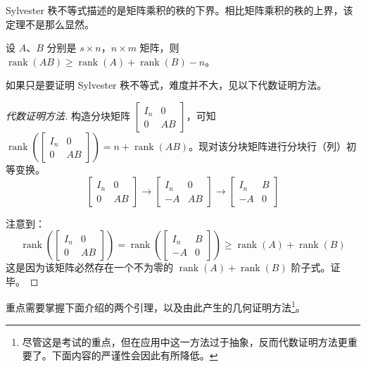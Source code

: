 Sylvester 秩不等式描述的是矩阵乘积的秩的下界。相比矩阵乘积的秩的上界，该定理不是那么显然。

\begin{theorem}
	设 $A$、$B$ 分别是 $s \times n$，$n \times m$ 矩阵，则 $\operatorname{rank}(AB) \ge \operatorname{rank}(A) + \operatorname{rank}(B) - n$。
\end{theorem}

如果只是要证明 Sylvester 秩不等式，难度并不大，见以下代数证明方法。

\begin{proof}[代数证明方法]
	构造分块矩阵 $\begin{bmatrix} I_n & 0 \\ 0 & AB \end{bmatrix}$，可知 $\operatorname{rank}\left(\begin{bmatrix} I_n & 0 \\ 0 & AB \end{bmatrix}\right) = n + \operatorname{rank}(AB)$。现对该分块矩阵进行分块行（列）初等变换。
	$$
	\begin{bmatrix} I_n & 0 \\ 0 & AB \end{bmatrix} \to
	\begin{bmatrix} I_n & 0 \\ -A & AB \end{bmatrix} \to
	\begin{bmatrix} I_n & B \\ -A & 0 \end{bmatrix}
	$$

	注意到：
	$$
	\operatorname{rank}\left(\begin{bmatrix} I_n & 0 \\ 0 & AB \end{bmatrix}\right) = \operatorname{rank}\left(\begin{bmatrix} I_n & B \\ -A & 0 \end{bmatrix}\right) \ge \operatorname{rank}(A) + \operatorname{rank}(B)
	$$
	这是因为该矩阵必然存在一个不为零的 $\operatorname{rank}(A) + \operatorname{rank}(B)$ 阶子式。证毕。
\end{proof}

\bigskip

重点需要掌握下面介绍的两个引理，以及由此产生的几何证明方法\footnote{尽管这是考试的重点，但在应用中这一方法过于抽象，反而代数证明方法更重要了。下面内容的严谨性会因此有所降低。}。


